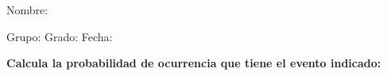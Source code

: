 \documentclass[12pt,addpoints]{exam}
\begin{document}
%

Nombre:\enspace\hrulefill

\vspace{5mm}

Grupo:\enspace\hrulefill
\enspace{}Grado:\enspace\hrulefill
\enspace{}Fecha:\enspace\hrulefill

\begin{questions}




\vspace{\baselineskip}
\textbf{Calcula la probabilidad de ocurrencia que tiene el evento indicado:}




\pagebreak




\end{questions}
\end{document}

